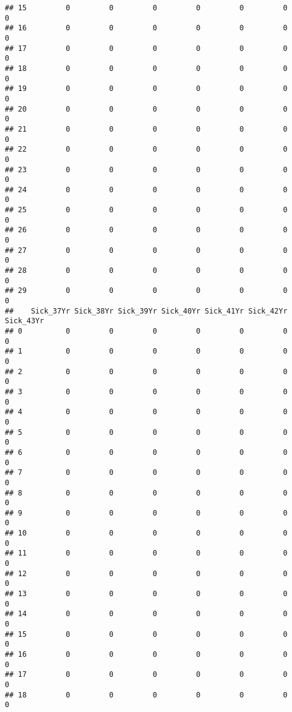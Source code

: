 \documentclass[
]{article}
\begin{document}
\begin{verbatim}
## 15         0         0         0         0         0         0         0
## 16         0         0         0         0         0         0         0
## 17         0         0         0         0         0         0         0
## 18         0         0         0         0         0         0         0
## 19         0         0         0         0         0         0         0
## 20         0         0         0         0         0         0         0
## 21         0         0         0         0         0         0         0
## 22         0         0         0         0         0         0         0
## 23         0         0         0         0         0         0         0
## 24         0         0         0         0         0         0         0
## 25         0         0         0         0         0         0         0
## 26         0         0         0         0         0         0         0
## 27         0         0         0         0         0         0         0
## 28         0         0         0         0         0         0         0
## 29         0         0         0         0         0         0         0
##    Sick_37Yr Sick_38Yr Sick_39Yr Sick_40Yr Sick_41Yr Sick_42Yr Sick_43Yr
## 0          0         0         0         0         0         0         0
## 1          0         0         0         0         0         0         0
## 2          0         0         0         0         0         0         0
## 3          0         0         0         0         0         0         0
## 4          0         0         0         0         0         0         0
## 5          0         0         0         0         0         0         0
## 6          0         0         0         0         0         0         0
## 7          0         0         0         0         0         0         0
## 8          0         0         0         0         0         0         0
## 9          0         0         0         0         0         0         0
## 10         0         0         0         0         0         0         0
## 11         0         0         0         0         0         0         0
## 12         0         0         0         0         0         0         0
## 13         0         0         0         0         0         0         0
## 14         0         0         0         0         0         0         0
## 15         0         0         0         0         0         0         0
## 16         0         0         0         0         0         0         0
## 17         0         0         0         0         0         0         0
## 18         0         0         0         0         0         0         0

\end{verbatim}
\end{document}
